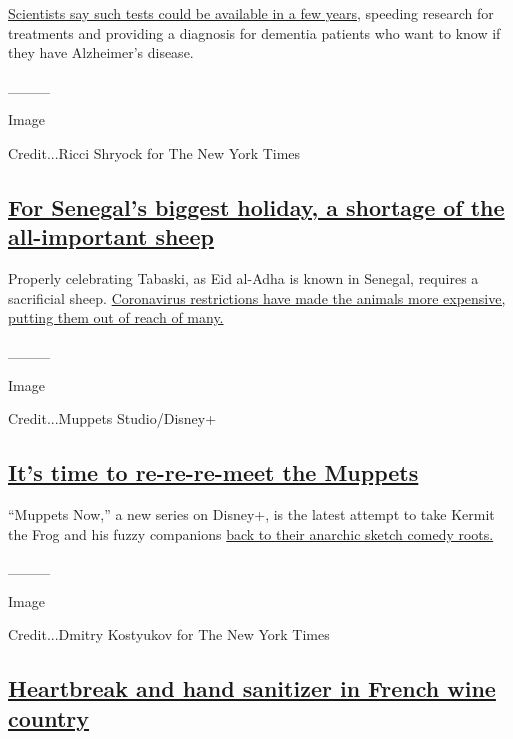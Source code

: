 \href{https://www.nytimes.com/2020/07/28/health/alzheimers-blood-test.html}{Scientists
say such tests could be available in a few years,} speeding research for
treatments and providing a diagnosis for dementia patients who want to
know if they have Alzheimer's disease.

\_\_\_\_

Image

Credit...Ricci Shryock for The New York Times

\hypertarget{for-senegals-biggest-holiday-a-shortage-of-the-all-important-sheep}{%
\subsection{\texorpdfstring{\href{https://www.nytimes.com/2020/07/29/world/africa/senegal-tabaski-sheep-eid-adha.html}{For
Senegal's biggest holiday, a shortage of the all-important
sheep}}{For Senegal's biggest holiday, a shortage of the all-important sheep}}\label{for-senegals-biggest-holiday-a-shortage-of-the-all-important-sheep}}

Properly celebrating Tabaski, as Eid al-Adha is known in Senegal,
requires a sacrificial sheep.
\href{https://www.nytimes.com/2020/07/29/world/africa/senegal-tabaski-sheep-eid-adha.html}{Coronavirus
restrictions have made the animals more expensive, putting them out of
reach of many.}

\_\_\_\_

Image

Credit...Muppets Studio/Disney+

\hypertarget{its-time-to-re-re-re-meet-the-muppets}{%
\subsection{\texorpdfstring{\href{https://www.nytimes.com/2020/07/23/arts/television/muppets-now-disney.html}{It's
time to re-re-re-meet the
Muppets}}{It's time to re-re-re-meet the Muppets}}\label{its-time-to-re-re-re-meet-the-muppets}}

``Muppets Now,'' a new series on Disney+, is the latest attempt to take
Kermit the Frog and his fuzzy companions
\href{https://www.nytimes.com/2020/07/23/arts/television/muppets-now-disney.html}{back
to their anarchic sketch comedy roots.}

\_\_\_\_

Image

Credit...Dmitry Kostyukov for The New York Times

\hypertarget{heartbreak-and-hand-sanitizer-in-french-wine-country}{%
\subsection{\texorpdfstring{\href{https://www.nytimes.com/2020/07/27/world/europe/france-alsace-wine-coronavirus.html}{Heartbreak
and hand sanitizer in French wine
country}}{Heartbreak and hand sanitizer in French wine country}}\label{heartbreak-and-hand-sanitizer-in-french-wine-country}}

